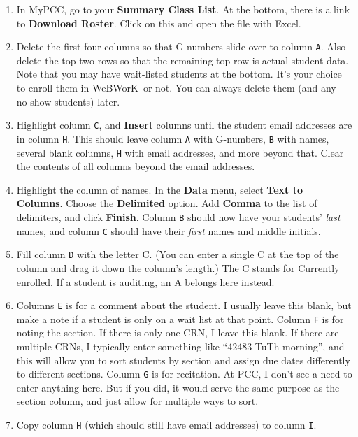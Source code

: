 \documentclass[12pt]{article}
\newcommand{\menu}[1]{\textbf{#1}}
\newcommand{\WW}{WeBWorK}
\begin{document}
\begin{enumerate}
	\item In MyPCC, go to your \menu{Summary Class List}.
	      At the bottom, there is a link to \menu{Download Roster}.
	      Click on this and open the file with Excel.
	\item Delete the first four columns so that G-numbers slide over to column \texttt{A}.
	      Also delete the top two rows so that the remaining top row is actual student data.
	      Note that you may have wait-listed students at the bottom.
	      It's your choice to enroll them in \WW\ or not.
	      You can always delete them (and any no-show students) later.
	\item Highlight column \texttt{C}, and \menu{Insert} columns until the student email addresses are in column \texttt{H}.
	      This should leave column \texttt{A} with G-numbers, \texttt{B} with names, several blank columns, \texttt{H} with email addresses, and more beyond that.
	      Clear the contents of all columns beyond the email addresses.
	\item Highlight the column of names.
	      In the \menu{Data} menu, select \menu{Text to Columns}.
	      Choose the \menu{Delimited} option.
	      Add \menu{Comma} to the list of delimiters, and click \menu{Finish}.
	      Column \texttt{B} should now have your students' \emph{last} names, and column \texttt{C} should have their \emph{first} names and middle initials.
	\item Fill column \texttt{D} with the letter C. (You can enter a single C at the top of the column and drag it down the column's length.) The C stands for Currently enrolled.
	      If a student is auditing, an A belongs here instead.
	\item Columns \texttt{E} is for a comment about the student.
	      I usually leave this blank, but make a note if a student is only on a wait list at that point.
	      Column \texttt{F} is for noting the section.
	      If there is only one CRN, I leave this blank.
	      If there are multiple CRNs, I typically enter something like ``42483 TuTh morning'', and this will allow you to sort students by section and assign due dates differently to different sections.
	      Column \texttt{G} is for recitation.
	      At PCC, I don't see a need to enter anything here.
	      But if you did, it would serve the same purpose as the section column, and just allow for multiple ways to sort.
	\item Copy column \texttt{H} (which should still have email addresses) to column \texttt{I}.

\end{enumerate}
\end{document}
